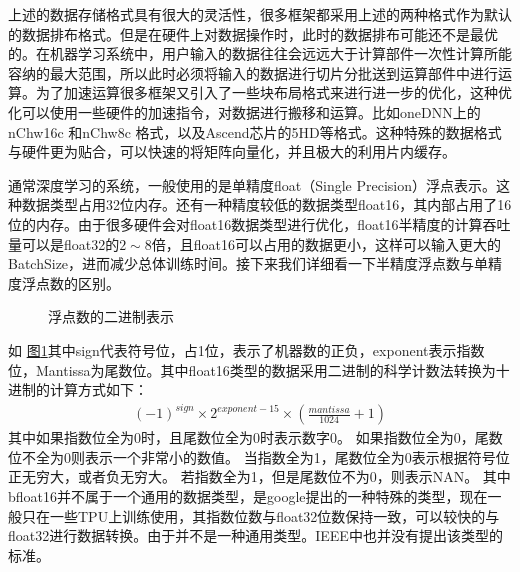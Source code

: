 \documentclass[letterpaper,10pt,english]{sphinxmanual}
\let\sphinxpxdimen\pdfpxdimen\else\newdimen\sphinxpxdimen
\begin{document}
\sphinxAtStartPar
上述的数据存储格式具有很大的灵活性，很多框架都采用上述的两种格式作为默认的数据排布格式。但是在硬件上对数据操作时，此时的数据排布可能还不是最优的。在机器学习系统中，用户输入的数据往往会远远大于计算部件一次性计算所能容纳的最大范围，所以此时必须将输入的数据进行切片分批送到运算部件中进行运算。为了加速运算很多框架又引入了一些块布局格式来进行进一步的优化，这种优化可以使用一些硬件的加速指令，对数据进行搬移和运算。比如oneDNN上的nChw16c
和nChw8c
格式，以及Ascend芯片的5HD等格式。这种特殊的数据格式与硬件更为贴合，可以快速的将矩阵向量化，并且极大的利用片内缓存。

\sphinxAtStartPar
{}

\sphinxAtStartPar
通常深度学习的系统，一般使用的是单精度float（Single
Precision）浮点表示。这种数据类型占用32位内存。还有一种精度较低的数据类型float16，其内部占用了16位的内存。由于很多硬件会对float16数据类型进行优化，float16半精度的计算吞吐量可以是float32的\(2\sim 8\)倍，且float16可以占用的数据更小，这样可以输入更大的BatchSize，进而减少总体训练时间。接下来我们详细看一下半精度浮点数与单精度浮点数的区别。

\begin{figure}[H]
\centering
\capstart

\noindent\sphinxincludegraphics[width=800\sphinxpxdimen]{{floatdtype}.png}
\caption{浮点数的二进制表示}\label{\detokenize{chapter_backend_and_runtime/kernel_selecter:id8}}\label{\detokenize{chapter_backend_and_runtime/kernel_selecter:floatdtype}}\end{figure}

\sphinxAtStartPar
如
\hyperref[\detokenize{chapter_backend_and_runtime/kernel_selecter:floatdtype}]{图\ref{\detokenize{chapter_backend_and_runtime/kernel_selecter:floatdtype}}}其中sign代表符号位，占1位，表示了机器数的正负，exponent表示指数位，Mantissa为尾数位。其中float16类型的数据采用二进制的科学计数法转换为十进制的计算方式如下：
\begin{equation}\label{equation:chapter_backend_and_runtime/kernel_selecter:chapter_backend_and_runtime/kernel_selecter:2}
\begin{split}(-1)^{sign}\times 2^{exponent-15}\times (\frac{mantissa}{1024}+1)\end{split}
\end{equation}
\sphinxAtStartPar
其中如果指数位全为0时，且尾数位全为0时表示数字0。
如果指数位全为0，尾数位不全为0则表示一个非常小的数值。
当指数全为1，尾数位全为0表示根据符号位正无穷大，或者负无穷大。
若指数全为1，但是尾数位不为0，则表示NAN。
其中bfloat16并不属于一个通用的数据类型，是google提出的一种特殊的类型，现在一般只在一些TPU上训练使用，其指数位数与float32位数保持一致，可以较快的与float32进行数据转换。由于并不是一种通用类型。IEEE中也并没有提出该类型的标准。
\end{document}
